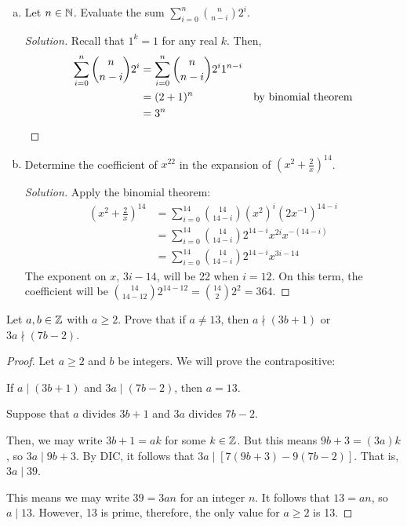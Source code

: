 \documentclass{agony}
\begin{document}
\question \begin{enumerate}[(a)]
  \item Let $n\in\mathbb{N}$. Evaluate the sum $\displaystyle\sum_{i=0}^n\binom{n}{n-i}2^i$.
        \begin{proof}[Solution]
          Recall that $1^k=1$ for any real $k$. Then,
          \begin{align*}
            \sum_{i=0}^n\binom{n}{n-i}2^i & = \sum_{i=0}^n\binom{n}{n-i}2^i 1^{n-i} \\
                                          & = (2+1)^n & \text{by binomial theorem}         \\
                                          & = 3^n \qedhere
          \end{align*}
        \end{proof}
  \item Determine the coefficient of $x^{22}$ in the expansion of $\left(x^2+\frac{2}{x}\right)^{14}$.
        \begin{proof}[Solution]
          Apply the binomial theorem:
          \begin{align*}
            \left(x^2+\frac{2}{x}\right)^{14} & = \sum_{i=0}^{14}\binom{14}{14-i}(x^2)^i (2x^{-1})^{14-i} \\
                                              & =\sum_{i=0}^{14}\binom{14}{14-i}2^{14-i}x^{2i}x^{-(14-i)} \\
                                              & =\sum_{i=0}^{14}\binom{14}{14-i}2^{14-i}x^{3i-14}
          \end{align*}
          The exponent on $x$, $3i-14$, will be 22 when $i=12$.
          On this term, the coefficient will be $\binom{14}{14-12}2^{14-12} = \binom{14}{2}2^2 = 364$.
        \end{proof}
\end{enumerate}


\question Let $a,b\in\mathbb{Z}$ with $a \geq 2$.
Prove that if $a \neq 13$, then $a \nmid (3b+1)$ or $3a \nmid (7b-2)$.
\begin{proof}
  Let $a \geq 2$ and $b$ be integers.
  We will prove the contrapositive:
  \begin{center}
    If $a \mid (3b+1)$ and $3a \mid (7b-2)$, then $a = 13$.
  \end{center}
  Suppose that $a$ divides $3b+1$ and $3a$ divides $7b-2$.

  Then, we may write $3b+1 = ak$ for some $k\in\mathbb{Z}$.
  But this means $9b+3 = (3a)k$, so $3a \mid 9b+3$.
  By DIC, it follows that $3a \mid [7(9b+3)-9(7b-2)]$.
  That is, $3a \mid 39$.

  This means we may write $39 = 3an$ for an integer $n$.
  It follows that $13 = an$, so $a \mid 13$.
  However, 13 is prime, therefore, the only value for $a \geq 2$ is 13.
\end{proof}
\end{document}
